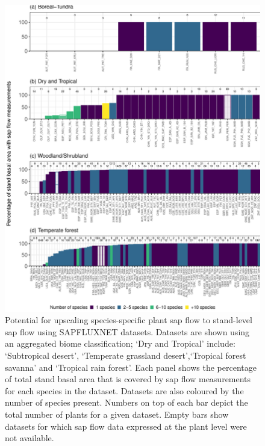 \documentclass[11pt,twoside]{reedthesis}
\begin{document}
\setlength{\abovecaptionskip}{0pt}
\begin{figure}[H]

{\centering \includegraphics[width=1\linewidth]{figure/CH3/Figure9} 

}

\caption[Potential for upscaling species-specific plant sap flow to stand-level.]{Potential for upscaling species-specific plant sap flow to stand-level sap flow using SAPFLUXNET datasets. Datasets are shown using an aggregated biome classification; ‘Dry and Tropical’ include: ‘Subtropical desert’, ‘Temperate grassland desert’,‘Tropical forest savanna’ and ‘Tropical rain forest’. Each panel shows the percentage of total stand basal area that is covered by sap flow measurements for each species in the dataset. Datasets are also coloured by the number of species present. Numbers on top of each bar depict the total number of plants for a given dataset. Empty bars show datasets for which sap flow data expressed at the plant level were not available.}\label{fig:Ch2plot9}
\end{figure}
\newpage
\end{document}
